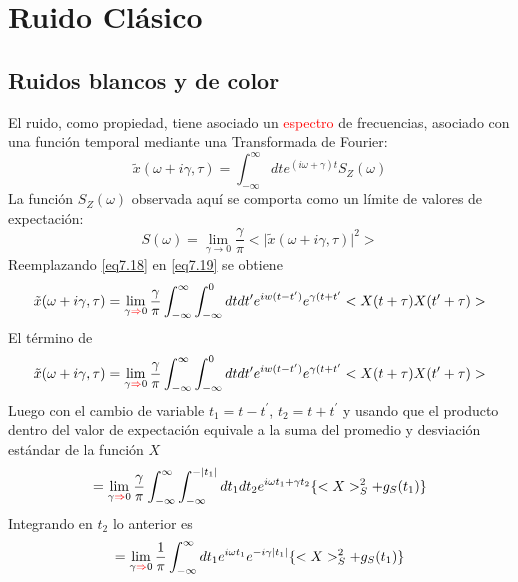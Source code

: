 \documentclass{book}
\begin{document}
\section{Ruido Clásico}
\subsection{Ruidos blancos y de color}
El ruido, como propiedad, tiene asociado un \textcolor{red}{espectro} de frecuencias, asociado con una función temporal mediante una Transformada de Fourier:
\begin{equation}\label{eq7.18}\tilde{x}(\omega+i\gamma, \tau)=\int_{-\infty}^{\infty} dt e^{(i\omega+\gamma)t}S_Z (\omega)\end{equation}
La función $S_Z(\omega)$ observada aquí se comporta como un límite de valores de expectación:
\begin{equation}\label{eq7.19}S(\omega)=\lim_{\gamma\rightarrow 0}\frac{\gamma}{\pi}<\lvert\tilde{x}(\omega +i\gamma,\tau)\rvert^2>\end{equation} Reemplazando \ref{eq7.18} en  \ref{eq7.19} se obtiene
\begin{equation}\label{eq7.20}\tilde{x}(\omega+i\gamma, \tau)=\lim_{\gamma\textcolor{red}{\Rightarrow} 0}\frac{\gamma}{\pi}\int_{-\infty}^{\infty}\int_{-\infty}^0 dt dt^\prime e^{iw(t-t^\prime)}e^{\gamma(t+t^\prime}<X(t+\tau)X(t^\prime+\tau)>\end{equation} El término de 
\begin{equation}\label{eq7.21}\tilde{x}(\omega+i\gamma, \tau)=\lim_{\gamma\textcolor{red}{\Rightarrow} 0}\frac{\gamma}{\pi}\int_{-\infty}^{\infty}\int_{-\infty}^0 dt dt^\prime e^{iw(t-t^\prime)}e^{\gamma(t+t^\prime}<X(t+\tau)X(t^\prime+\tau)>\end{equation}
Luego con el cambio de variable $t_1=t-t^\prime$, $t_2=t+t^\prime$ y usando que el producto dentro del valor de expectación equivale a la suma del promedio y desviación estándar de la función $X$
\begin{equation}\label{eq7.22}=\lim_{\gamma\textcolor{red}{\Rightarrow} 0} \frac{\gamma}{\pi}\int_{-\infty}^\infty \int_{-\infty}^{-\lvert t_1\rvert}dt_1 dt_2 e^{i\omega t_1+\gamma t_2}\{<X>_S^2+g_S(t_1)\}\end{equation}
Integrando en $t_2$ lo anterior es
\begin{equation}\label{eq7.23}=\lim_{\gamma\textcolor{red}{\Rightarrow} 0}\frac{1}{\pi}\int_{-\infty}^\infty dt_1 e^{i\omega t_1 }e^{-i\gamma\lvert t_1\rvert}\{<X>_S^2+g_S(t_1)\}\end{equation}
\end{document}
